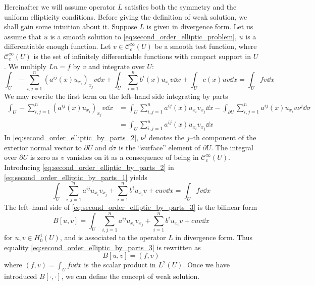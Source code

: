Hereinafter we will assume operator $L$ satisfies both the symmetry and the
uniform ellipticity conditions. Before giving the definition of weak solution,
we shall gain some intuition about it. Suppose $L$ is given in divergence form.
Let us assume that $u$ is a smooth solution to
\eqref{eq:second_order_elliptic_problem}, \ie $u$ is a differentiable enough
function. Let $v \in \mathcal{C}_c^\infty(U)$ be a smooth test function, where
$\mathcal{C}_c^\infty(U)$ is the set of infinitely differentiable functions with
compact support in $U$. We multiply $L u = f$ by $v$ and integrate over $U$:
\begin{equation} \label{eq:second_order_elliptic_by_parts_1}
	\int_U - \sum_{i,j=1}^n (a^{ij}(x) u_{x_i})_{x_j} v \dd{x} + 
	\int_U \sum_{i=1}^n b^i(x) u_{x_i} v \dd{x} + 
	\int_U c(x) u v \dd{x} = 
	\int_U f v \dd{x}
\end{equation}
We may rewrite the first term on the left--hand side integrating by parts
\begin{align}
	\int_U - \sum_{i,j=1}^n (a^{ij}(x) u_{x_i})_{x_j} v \dd{x} &= 
	\int_U \sum_{i,j=1}^n a^{ij}(x) u_{x_i} v_{x_j} \dd{x} - 
	\int_{\partial U} \sum_{i,j=1}^n a^{ij}(x) u_{x_i} v \nu^j \dd{\sigma} \nonumber \\
	&= \int_U \sum_{i,j=1}^n a^{ij}(x) u_{x_i} v_{x_j} \dd{x} \label{eq:second_order_elliptic_by_parts_2}
\end{align}
In \eqref{eq:second_order_elliptic_by_parts_2}, $\nu^j$ denotes the $j$--th
component of the exterior normal vector to $\partial U$ and $\dd{\sigma}$ is the
``surface'' element of $\partial U$. The integral over $\partial U$ is zero as
$v$ vanishes on it as a consequence of being in $\mathcal{C}^\infty_c(U)$.
Introducing \eqref{eq:second_order_elliptic_by_parts_2} in
\eqref{eq:second_order_elliptic_by_parts_1} yields
\begin{equation} \label{eq:second_order_elliptic_by_parts_3}
	\int_U \sum_{i,j=1}^n a^{ij} u_{x_i} v_{x_j} + \sum_{i=1}^n b^i u_{x_i} v + c u v \dd{x} =
	\int_U f v \dd{x}
\end{equation}
The left--hand side of \eqref{eq:second_order_elliptic_by_parts_3} is the
bilinear form
\begin{equation}
	B[u,v] = 
	\int_U \sum_{i,j=1}^n a^{ij} u_{x_i} v_{x_j} + \sum_{i=1}^n b^i u_{x_i} v + c u v \dd{x}
\end{equation}
for $u, v \in H^1_0(U)$, and is associated to the operator $L$ in divergence
form. Thus equality \eqref{eq:second_order_elliptic_by_parts_3} is rewritten as
\begin{equation}
	B[u,v] = (f, v)
\end{equation}
where $(f, v) = \int_U f v \dd{x}$ is the scalar product in $L^2(U)$. Once we
have introduced $B[\cdot,\cdot]$, we can define the concept of weak solution.

